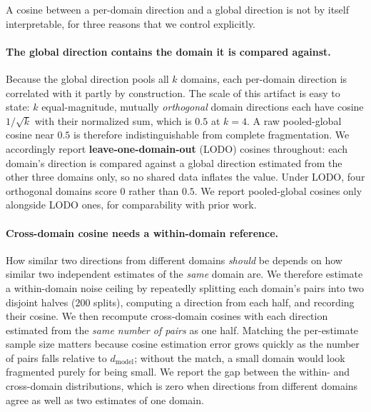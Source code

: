 \documentclass[11pt]{article}
\begin{document}
A cosine between a per-domain direction and a global direction is not by
itself interpretable, for three reasons that we control explicitly.

\paragraph{The global direction contains the domain it is compared against.}
Because the global direction pools all $k$ domains, each per-domain direction
is correlated with it partly by construction. The scale of this artifact is
easy to state: $k$ equal-magnitude, mutually \emph{orthogonal} domain
directions each have cosine $1/\sqrt{k}$ with their normalized sum, which is
$0.5$ at $k{=}4$. A raw pooled-global cosine near $0.5$ is therefore
indistinguishable from complete fragmentation. We accordingly report
\textbf{leave-one-domain-out} (LODO) cosines throughout: each domain's
direction is compared against a global direction estimated from the other
three domains only, so no shared data inflates the value. Under LODO, four
orthogonal domains score $0$ rather than $0.5$. We report pooled-global
cosines only alongside LODO ones, for comparability with prior work.

\paragraph{Cross-domain cosine needs a within-domain reference.}
How similar two directions from different domains \emph{should} be depends on
how similar two independent estimates of the \emph{same} domain are. We
therefore estimate a within-domain noise ceiling by repeatedly splitting each
domain's pairs into two disjoint halves ($200$ splits), computing a direction
from each half, and recording their cosine. We then recompute cross-domain
cosines with each direction estimated from the \emph{same number of pairs} as
one half. Matching the per-estimate sample size matters because cosine
estimation error grows quickly as the number of pairs falls relative to
$d_{\text{model}}$; without the match, a small domain would look fragmented
purely for being small. We report the gap between the within- and
cross-domain distributions, which is zero when directions from different
domains agree as well as two estimates of one domain.
\end{document}
